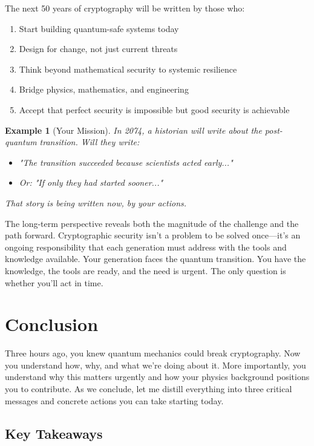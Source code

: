\documentclass[11pt,a4paper]{article}
\newtheorem{example}{Example}
\begin{document}
The next 50 years of cryptography will be written by those who:
\begin{enumerate}
    \item Start building quantum-safe systems today
    \item Design for change, not just current threats
    \item Think beyond mathematical security to systemic resilience
    \item Bridge physics, mathematics, and engineering
    \item Accept that perfect security is impossible but good security is achievable
\end{enumerate}

\begin{example}[Your Mission]
In 2074, a historian will write about the post-quantum transition. Will they write:
\begin{itemize}
    \item "The transition succeeded because scientists acted early..."
    \item Or: "If only they had started sooner..."
\end{itemize}
That story is being written now, by your actions.
\end{example}

The long-term perspective reveals both the magnitude of the challenge and the path forward. Cryptographic security isn't a problem to be solved once—it's an ongoing responsibility that each generation must address with the tools and knowledge available. Your generation faces the quantum transition. You have the knowledge, the tools are ready, and the need is urgent. The only question is whether you'll act in time.

\section{Conclusion}
\label{sec:conclusion}

Three hours ago, you knew quantum mechanics could break cryptography. Now you understand how, why, and what we're doing about it. More importantly, you understand why this matters urgently and how your physics background positions you to contribute. As we conclude, let me distill everything into three critical messages and concrete actions you can take starting today.

\subsection{Key Takeaways}
\end{document}

